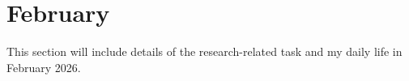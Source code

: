\chapter{February}
\label{chap:Feb}


This section will include details of the research-related task and my daily life in February 2026.

% 
% 
% 

